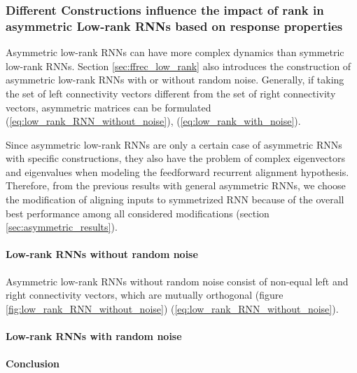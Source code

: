 \documentclass[11pt]{article}
\begin{document}
	\subsubsection{Different Constructions influence the impact of rank in asymmetric Low-rank RNNs based on response properties}
	
	Asymmetric low-rank RNNs can have more complex dynamics than symmetric low-rank RNNs. Section \ref{sec:ffrec_low_rank} also introduces the construction of asymmetric low-rank RNNs with or without random noise. Generally, if taking the set of left connectivity vectors different from the set of right connectivity vectors, asymmetric matrices can be formulated (\ref{eq:low_rank_RNN_without_noise}), (\ref{eq:low_rank_with_noise}). 
	
	Since asymmetric low-rank RNNs are only a certain case of asymmetric RNNs with specific constructions, they also have the problem of complex eigenvectors and eigenvalues when modeling the feedforward recurrent alignment hypothesis. Therefore, from the previous results with general asymmetric RNNs, we choose the modification of aligning inputs to symmetrized RNN because of the overall best performance among all considered modifications (section \ref{sec:asymmetric_results}).
	
	\paragraph{Low-rank RNNs without random noise}
	
	Asymmetric low-rank RNNs without random noise consist of non-equal left and right connectivity vectors, which are mutually orthogonal (figure \ref{fig:low_rank_RNN_without_noise}) (\ref{eq:low_rank_RNN_without_noise}). 
	
	\paragraph{Low-rank RNNs with random noise}
	
	\paragraph{Conclusion}
	
\end{document}
